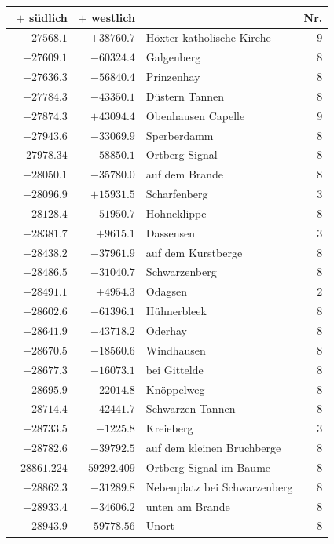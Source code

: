 \clearpage{}%
\begin{center}\begingroup\fontsize{8}{9}\selectfont
\setlength{\tabcolsep}{4pt}
\begin{tabular}{r|r|p{170pt}|r}\hline
\(+\) südlich&\(+\) westlich&&Nr.\\\hline
\(-27568.1\)&\(+38760.7\)&Höxter katholische Kirche&\(9\)\\
\(-27609.1\)&\(-60324.4\)&Galgenberg&\(8\)\\
\(-27636.3\)&\(-56840.4\)&Prinzenhay&\(8\)\\
\(-27784.3\)&\(-43350.1\)&Düstern Tannen&\(8\)\\
\(-27874.3\)&\(+43094.4\)&Obenhausen Capelle&\(9\)\\
\(-27943.6\)&\(-33069.9\)&Sperberdamm&\(8\)\\
\(-27978.34\)&\(-58850.1\)&Ortberg Signal&\(8\)\\
\(-28050.1\)&\(-35780.0\)&auf dem Brande&\(8\)\\
\(-28096.9\)&\(+15931.5\)&Scharfenberg&\(3\)\\
\(-28128.4\)&\(-51950.7\)&Hohneklippe&\(8\)\\
\(-28381.7\)&\(+9615.1\)&Dassensen&\(3\)\\
\(-28438.2\)&\(-37961.9\)&auf dem Kurstberge&\(8\)\\
\(-28486.5\)&\(-31040.7\)&Schwarzenberg&\(8\)\\
\(-28491.1\)&\(+4954.3\)&Odagsen&\(2\)\\
\(-28602.6\)&\(-61396.1\)&Hühnerbleek&\(8\)\\
\(-28641.9\)&\(-43718.2\)&Oderhay&\(8\)\\
\(-28670.5\)&\(-18560.6\)&Windhausen&\(8\)\\
\(-28677.3\)&\(-16073.1\)&bei Gittelde&\(8\)\\
\(-28695.9\)&\(-22014.8\)&Knöppelweg&\(8\)\\
\(-28714.4\)&\(-42441.7\)&Schwarzen Tannen&\(8\)\\
\(-28733.5\)&\(-1225.8\)&Kreieberg&\(3\)\\
\(-28782.6\)&\(-39792.5\)&auf dem kleinen Bruchberge&\(8\)\\
\(-28861.224\)&\(-59292.409\)&Ortberg Signal im Baume&\(8\)\\
\(-28862.3\)&\(-31289.8\)&Nebenplatz bei Schwarzenberg&\(8\)\\
\(-28933.4\)&\(-34606.2\)&unten am Brande&\(8\)\\
\(-28943.9\)&\(-59778.56\)&Unort&\(8\)\\

\end{tabular}
\end{center}
